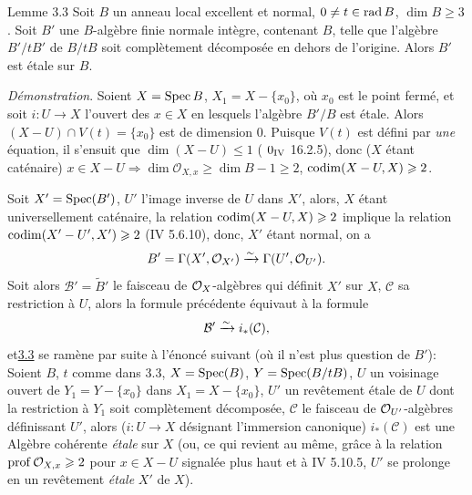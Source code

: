\documentclass[10pt]{../fichiers-configuration-latex/smfart}
\begin{document}
\begin{enonce*}{Lemme 3.3}
Soit $B$ un anneau local excellent et normal, $0\neq t\in \operatorname{rad} B$,
$\dim B\geq 3$. Soit $B'$ une $B$-algèbre finie normale intègre,
contenant $B$, telle que l'algèbre $B'/tB'$ de $B/tB$ soit
complètement décomposée en dehors de l'origine. Alors $B'$ est étale
sur $B$.
\end{enonce*}

\noindent
\emph{Démonstration}. Soient $X=\operatorname{Spec} B$, $X_1=X-\{x_{0}\}$, où
$x_{0}$ est le point fermé, et soit $i:U\rightarrow X$ l'ouvert
des $x\in X$ en lesquels l'algèbre $B'/B$ est étale. Alors $(X-U)\cap
V(t)=\{x_{0}\}$ est de dimension $0$. Puisque $V(t)$ est défini
par \emph{une} équation, il s'ensuit que $\dim(X-U)\leq 1$ (\EGA
$0_{\text{\rm IV}}$ 16.2.5), donc ($X$ étant caténaire) $x\in
X-U\Rightarrow \dim \mathcal{O}_{X,x}\geq \dim B-1\geq 2$, \ie
$\operatorname{codim}(X-U,X)\geqslant 2$.

Soit $X'=\operatorname{Spec}(B')$, $U'$ l'image inverse de $U$ dans $X'$, alors, $X$
étant universellement caténaire, la relation $\operatorname{codim}(X-U,X)\geqslant 2$
implique la relation $\operatorname{codim}(X'-U',X')\geqslant 2$ (\EGA IV 5.6.10), donc,
$X'$ étant normal, on a
$$
B'=\Gamma(X',{\mathcal O}_{X'})\xrightarrow{\sim}
\Gamma(U',{\mathcal O}_{U'}){}.
$$
Soit alors $\mathcal{B}'=\widetilde{B}'$ le faisceau de ${\mathcal O}_X$-algèbres qui
définit $X'$ sur $X$, $\mathcal{C}$ sa restriction à $U$, alors la formule
précédente équivaut à la formule
$$
\mathcal{B}'\xrightarrow{\sim}i_{\ast}(\mathcal{C}){},
$$
et\pageoriginale \hyperref[XV.lem3.3]{3.3} se ramène par suite à l'énoncé suivant (où il
n'est plus question de $B'$): Soient $B$, $t$ comme dans 3.3,
$X=\operatorname{Spec}(B)$, $Y=\operatorname{Spec}(B/tB)$, $U$ un voisinage ouvert de
$Y_1=Y-\{x_{0}\}$ dans $X_1=X-\{x_{0}\}$, $U'$ un revêtement
étale de $U$ dont la restriction à $Y_1$ soit complètement décomposée,
$\mathcal{C}$ le faisceau de ${\mathcal O}_{U'}$-algèbres définissant $U'$, alors
($i:U\rightarrow X$ désignant l'immersion canonique) $i_{\ast}(\mathcal{C})$
est une Algèbre cohérente \emph{étale} sur $X$ (ou, ce qui revient au
même, grâce à la relation $\operatorname{prof} {\mathcal O}_{X,x}\geqslant 2$ pour $x\in X-U$
signalée plus haut et à \EGA IV 5.10.5, $U'$ se prolonge en un
revêtement \emph{étale} $X'$ de $X$).
\end{document}
